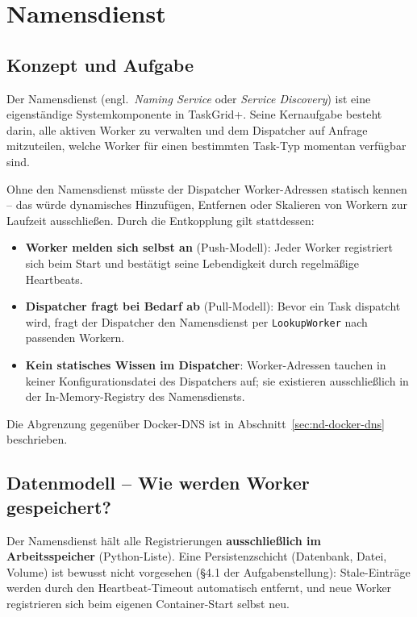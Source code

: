 \section{Namensdienst}
\label{sec:namensdienst-doku}

\subsection{Konzept und Aufgabe}

Der Namensdienst (engl.\ \emph{Naming Service} oder \emph{Service Discovery})
ist eine eigenständige Systemkomponente in TaskGrid+{}.
Seine Kernaufgabe besteht darin, alle aktiven Worker zu verwalten und dem
Dispatcher auf Anfrage mitzuteilen, welche Worker für einen bestimmten
Task-Typ momentan verfügbar sind.

\noindent Ohne den Namensdienst müsste der Dispatcher Worker-Adressen statisch
kennen -- das würde dynamisches Hinzufügen, Entfernen oder Skalieren von
Workern zur Laufzeit ausschließen.
Durch die Entkopplung gilt stattdessen:

\begin{itemize}
  \item \textbf{Worker melden sich selbst an} (Push-Modell):
        Jeder Worker registriert sich beim Start und bestätigt seine
        Lebendigkeit durch regelmäßige Heartbeats.
  \item \textbf{Dispatcher fragt bei Bedarf ab} (Pull-Modell):
        Bevor ein Task dispatcht wird, fragt der Dispatcher den Namensdienst
        per \texttt{LookupWorker} nach passenden Workern.
  \item \textbf{Kein statisches Wissen im Dispatcher}:
        Worker-Adressen tauchen in keiner Konfigurationsdatei des Dispatchers
        auf; sie existieren ausschließlich in der In-Memory-Registry des
        Namensdiensts.
\end{itemize}

\noindent Die Abgrenzung gegenüber Docker-DNS ist in Abschnitt~\ref{sec:nd-docker-dns}
beschrieben.

\subsection{Datenmodell -- Wie werden Worker gespeichert?}
\label{sec:nd-datenmodell}

Der Namensdienst hält alle Registrierungen \textbf{ausschließlich im
Arbeitsspeicher} (Python-Liste).
Eine Persistenzschicht (Datenbank, Datei, Volume) ist bewusst nicht
vorgesehen (§4.1 der Aufgabenstellung):
Stale-Einträge werden durch den Heartbeat-Timeout automatisch entfernt,
und neue Worker registrieren sich beim eigenen Container-Start selbst neu.

